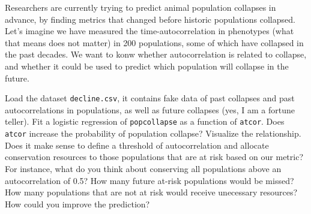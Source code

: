 \documentclass[12pt,a4paper]{scrartcl}\usepackage[]{graphicx}\usepackage[]{color}
\begin{document}
\begin{Exercise}[difficulty=2, title={What populations are at risk?}]
Researchers are currently trying to predict animal population collapses in advance, by finding metrics that changed before historic populations collapsed. Let's imagine we have measured the time-autocorrelation in phenotypes (what that means does not matter) in 200 populations, some of which have collapsed in the past decades. We want to konw whether autocorrelation is related to collapse, and whether it could be used to predict which population will collapse in the future. 

Load the dataset \texttt{decline.csv}, it contains fake data of past collapses and past autocorrelations in populations, as well as future collapses (yes, I am a fortune teller). Fit a logistic regression of \texttt{popcollapse} as a function of \texttt{atcor}. Does \texttt{atcor} increase the probability of population collapse? Visualize the relationship. Does it make sense to define a threshold of autocorrelation and allocate conservation resources to those populations that are at risk based on our metric? For instance, what do you think about conserving all populations above an autocorrelation of 0.5? How many future at-risk populations would be missed? How many populations that are not at risk would receive unecessary resources? How could you improve the prediction?


\end{Exercise}
\end{document}
